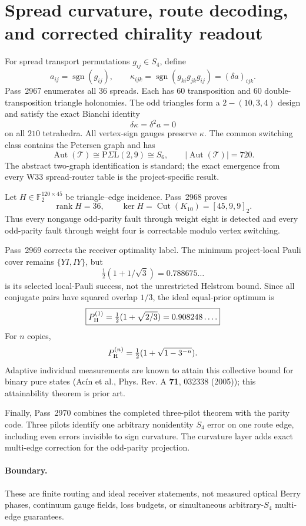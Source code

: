 \section{Spread curvature, route decoding, and corrected chirality readout}
\label{sec:bt2967-bt2970}

For spread transport permutations \(g_{ij}\in S_4\), define
\[
 a_{ij}=\operatorname{sgn}(g_{ij}),\qquad
 \kappa_{ijk}=\operatorname{sgn}(g_{ki}g_{jk}g_{ij})=(\delta a)_{ijk}.
\]
Pass~2967 enumerates all \(36\) spreads.  Each has \(60\) transposition and
\(60\) double-transposition triangle holonomies.  The odd triangles form a
\(2-(10,3,4)\) design and satisfy the exact Bianchi identity
\[
 \delta\kappa=\delta^2a=0
\]
on all \(210\) tetrahedra.  All vertex-sign gauges preserve \(\kappa\).  The
common switching class contains the Petersen graph and has
\[
 \operatorname{Aut}(\mathcal T)\cong\mathrm{P}\Sigma\mathrm L(2,9)\cong S_6,
 \qquad |\operatorname{Aut}(\mathcal T)|=720.
\]
The abstract two-graph identification is standard; the exact emergence from
every W33 spread-router table is the project-specific result.

Let \(H\in\mathbb F_2^{120\times45}\) be triangle--edge incidence.  Pass~2968
proves
\[
 \operatorname{rank}H=36,
 \qquad \ker H=\operatorname{Cut}(K_{10})=[45,9,9]_2.
\]
Thus every nongauge odd-parity fault through weight eight is detected and every
odd-parity fault through weight four is correctable modulo vertex switching.

Pass~2969 corrects the receiver optimality label.  The minimum project-local
Pauli cover remains \(\{YI,IY\}\), but
\[
 \tfrac12(1+1/\sqrt3)=0.788675\ldots
\]
is its selected local-Pauli success, not the unrestricted Helstrom bound.  Since
all conjugate pairs have squared overlap \(1/3\), the ideal equal-prior optimum is
\[
 \boxed{P_{\rm H}^{(1)}=\tfrac12(1+\sqrt{2/3})=0.908248\ldots .}
\]
For \(n\) copies,
\[
 P_{\rm H}^{(n)}=\tfrac12(1+\sqrt{1-3^{-n}}).
\]
Adaptive individual measurements are known to attain this collective bound for
binary pure states (Ac\'in et al., Phys. Rev. A \textbf{71}, 032338 (2005));
this attainability theorem is prior art.

Finally, Pass~2970 combines the completed three-pilot theorem with the parity
code.  Three pilots identify one arbitrary nonidentity \(S_4\) error on one
route edge, including even errors invisible to sign curvature.  The curvature
layer adds exact multi-edge correction for the odd-parity projection.

\paragraph{Boundary.}
These are finite routing and ideal receiver statements, not measured optical
Berry phases, continuum gauge fields, loss budgets, or simultaneous
arbitrary-\(S_4\) multi-edge guarantees.
